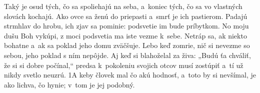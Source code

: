 Taký je osud tých, čo sa spoliehajú na seba,
a~koniec tých, čo sa vo vlastných slovách kochajú.
\versseparator
Ako ovce sa ženú do priepasti
a~smrť je ich pastierom.
\versseparator
Padajú strmhlav do hrobu,
ich zjav sa pominie:
podsvetie im bude príbytkom.
\versseparator
No moju dušu Boh vykúpi,
z moci podsvetia ma iste vezme k~sebe.
\versseparator
Netráp sa, ak niekto bohatne
a~ak sa poklad jeho domu zväčšuje.
\versseparator
Lebo keď zomrie, nič si nevezme so sebou,
jeho poklad s ním nepôjde.
\versseparator
Aj keď si blahoželal za živa:
„Budú ťa chváliť, že si si dobre počínal,“
\versseparator
predsa k~pokoleniu svojich otcov musí zostúpiť
a~tí už nikdy svetlo neuzrú.
\versseparator
1A keby človek mal čo akú hodnosť, a~toto by si nevšímal,
je ako lichva, čo hynie;
v~tom je jej podobný.